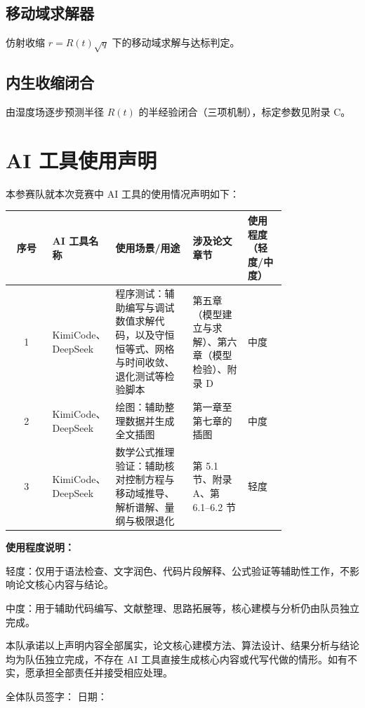 \documentclass[12pt,a4paper]{ctexart}
\numberwithin{equation}{section}
\begin{document}
\subsection{移动域求解器}
仿射收缩 $r=R(t)\sqrt q$ 下的移动域求解与达标判定。


\subsection{内生收缩闭合}
由湿度场逐步预测半径 $R(t)$ 的半经验闭合（三项机制），标定参数见附录 C。


\clearpage
\section*{AI 工具使用声明}

本参赛队就本次竞赛中 AI 工具的使用情况声明如下：

\begin{table}[H]
\centering
\small
\begin{tabular}{@{}cp{0.15\linewidth}p{0.29\linewidth}p{0.20\linewidth}p{0.14\linewidth}@{}}
\toprule
序号 & AI 工具名称 & 使用场景/用途 & 涉及论文章节 & 使用程度（轻度/中度） \\
\midrule
1 & KimiCode、DeepSeek & 程序测试：辅助编写与调试数值求解代码，以及守恒恒等式、网格与时间收敛、退化测试等检验脚本 & 第五章（模型建立与求解）、第六章（模型检验）、附录 D & 中度 \\
2 & KimiCode、DeepSeek & 绘图：辅助整理数据并生成全文插图 & 第一章至第七章的插图 & 中度 \\
3 & KimiCode、DeepSeek & 数学公式推理验证：辅助核对控制方程与移动域推导、解析谱解、量纲与极限退化 & 第 5.1 节、附录 A、第 6.1--6.2 节 & 轻度 \\
\bottomrule
\end{tabular}
\end{table}

\textbf{使用程度说明：}

轻度：仅用于语法检查、文字润色、代码片段解释、公式验证等辅助性工作，不影响论文核心内容与结论。

中度：用于辅助代码编写、文献整理、思路拓展等，核心建模与分析仍由队员独立完成。

本队承诺以上声明内容全部属实，论文核心建模方法、算法设计、结果分析与结论均为队伍独立完成，不存在 AI 工具直接生成核心内容或代写代做的情形。如有不实，愿承担全部责任并接受相应处理。

\vspace{1em}
\noindent 全体队员签字：\underline{\hspace{4cm}} \hfill 日期：\underline{\hspace{3cm}}
\end{document}
